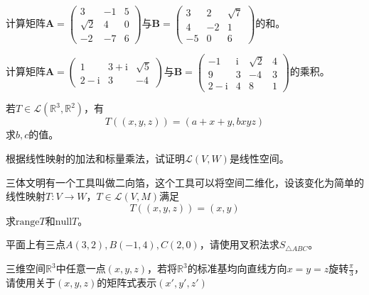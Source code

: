 \begin{reidai}
	计算矩阵$\mathbf{A}=\begin{pmatrix}  
		3 & -1 & 5 \\  
		\sqrt{2} & 4 & 0 \\  
		-2 & -7 & 6  
	  \end{pmatrix} $与$\mathbf{B}=\begin{pmatrix}  
		3 & 2 & \sqrt{7} \\  
		4 & -2 & 1 \\  
		-5 & 0 & 6  
	  \end{pmatrix} $的和。
\end{reidai}

\begin{reidai}
	计算矩阵$\mathbf{A}=\begin{pmatrix}  
		1 & 3+\mathrm{i} & \sqrt{5}  \\  
		2-\mathrm{i} & 3 & -4 
	  \end{pmatrix} $与$\mathbf{B}=\begin{pmatrix}  
		-1 & \mathrm{i} & \sqrt{2} & 4  \\  
		9 & 3 & -4 & 3 \\
		2-\mathrm{i} & 4 & 8 & 1
	  \end{pmatrix} $的乘积。
\end{reidai}

\begin{reidai}
	若$T\in \mathcal{L}(\mathbb{R}^3,\mathbb{R}^2)$，有$$T((x,y,z))=(a+x+y,bxyz)$$求$b,c$的值。
\end{reidai}

\begin{reidai}
	根据线性映射的加法和标量乘法，试证明$\mathcal{L}(V,W)$是线性空间。
\end{reidai}

\begin{reidai}
	三体文明有一个工具叫做二向箔，这个工具可以将空间二维化，设该变化为简单的线性映射$T:V\rightarrow W$，$T\in \mathcal{L}(V,M)$满足$$T((x,y,z))=(x,y)$$求$\text{range}T$和$\text{null}T$。
\end{reidai}

\begin{reidai}
	平面上有三点$A(3,2),B(-1,4),C(2,0)$，请使用叉积法求$S_{\triangle ABC}$。
\end{reidai}

\begin{reidai}
	三维空间$\mathbb{R}^3$中任意一点$(x,y,z)$，若将$\mathbb{R}^3$的标准基均向直线方向$x=y=z$旋转$\displaystyle \frac{\pi}{3}$，请使用关于$(x,y,z)$的矩阵式表示$(x',y',z')$
\end{reidai}

